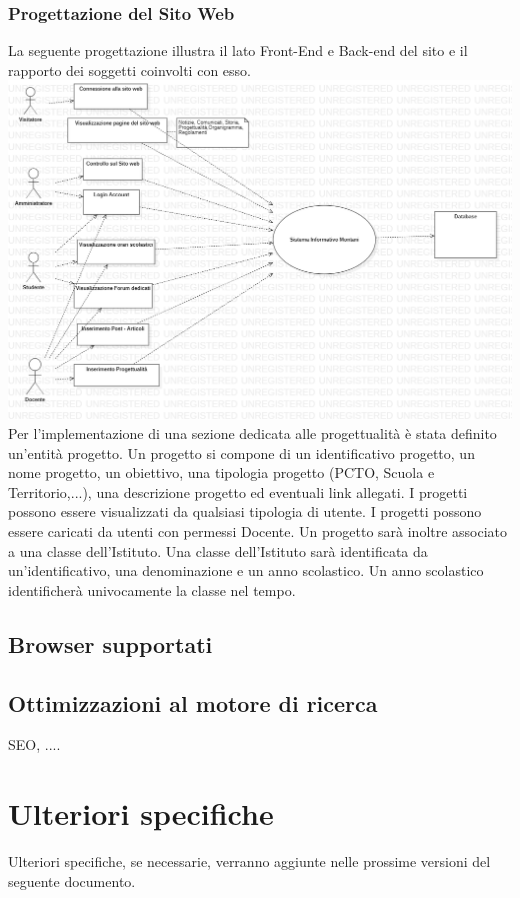 \documentclass{article}
\begin{document}
	\subsubsection{\textbf{Progettazione del Sito Web}}
	La seguente progettazione illustra il lato Front-End e Back-end del sito e il rapporto dei soggetti coinvolti con esso.	
	\includegraphics[scale=0.35]{UseCaseDiagram.png}
	Per l'implementazione di una sezione dedicata alle progettualità è stata definito un'entità progetto. Un progetto si compone di un identificativo progetto, un nome progetto, un obiettivo, una tipologia progetto (PCTO, Scuola e Territorio,...), una descrizione progetto ed eventuali link allegati. I progetti possono essere visualizzati da qualsiasi tipologia di utente. I progetti possono essere caricati da utenti con permessi Docente. Un progetto sarà inoltre associato a una classe dell'Istituto. Una classe dell'Istituto sarà identificata da un'identificativo, una denominazione e un anno scolastico. Un anno scolastico identificherà univocamente la classe nel tempo.

	\subsection{\textbf{Browser supportati}}

	\subsection{\textbf{Ottimizzazioni al motore di ricerca}}
	SEO, ....	
\clearpage
	
\section{\textbf{Ulteriori specifiche}}
Ulteriori specifiche, se necessarie, verranno aggiunte nelle prossime versioni del seguente documento.
\end{document}
